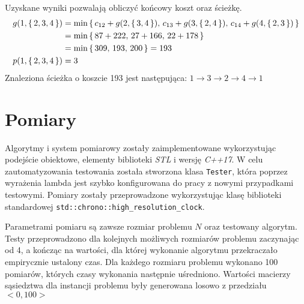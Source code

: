 \documentclass[12pt]{article}
\begin{document}
Uzyskane wyniki pozwalają obliczyć końcowy koszt oraz ścieżkę.
\begin{align}
    g(1, \set{2,3,4}) & = \min\set{c_{12}+g(2, \set{3,4}),\,c_{13}+g(3, \set{2,4}),\,c_{14}+g(4, \set{2,3})}\nonumber \\
                      & = \min{\set{87+222,\,27+166,\,22+178}}                                                        \\
                      & = \min{\set{309,\,193,\,200}} = 193 \nonumber                                                 \\
    p(1, \set{2,3,4}) & = 3
\end{align}
Znaleziona ścieżka o koszcie 193 jest następująca:
$ 1 \rightarrow 3 \rightarrow 2 \rightarrow 4 \rightarrow 1 $
\section{Pomiary}
Algorytmy i system pomiarowy zostały zaimplementowane wykorzystując podejście obiektowe, elementy biblioteki \textit{STL} i wersję \textit{C++17}.
W celu zautomatyzowania testowania została stworzona klasa \lstinline{Tester}, która poprzez wyrażenia lambda jest szybko konfigurowana do pracy z nowymi przypadkami testowymi. Pomiary zostały przeprowadzone wykorzystując klasę biblioteki standardowej \lstinline{std::chrono::high_resolution_clock}.

Parametrami pomiaru są zawsze rozmiar problemu $N$ oraz testowany algorytm. Testy przeprowadzono dla kolejnych możliwych rozmiarów problemu zaczynając od 4, a kończąc na wartości, dla której wykonanie algorytmu przekraczało empirycznie ustalony czas. Dla każdego rozmiaru problemu wykonano 100 pomiarów, których czasy wykonania następnie uśredniono. Wartości macierzy sąsiedztwa dla instancji problemu były generowana losowo z przedziału $<0,100>$


\newcommand{\oneplot}[3]{
    \begin{figure}[H]
        \centering
        \begin{tikzpicture}
            \begin{axis}[
                width=0.9\linewidth,
                height=7cm,
                grid=major,
                xlabel=N,
                ylabel=T{[s]},
                xticklabel={%
                        \pgfmathtruncatemacro{\IntegerTick}{\tick}%
                        \pgfmathprintnumberto[verbatim,fixed,precision=3]{\tick}\tickAdjusted%
                        \pgfmathparse{\IntegerTick == \tickAdjusted ? 1: 0}%
                        \ifnum\pgfmathresult>0\relax$\IntegerTick$\else\fi%
                    },
                legend style={anchor=north west, at={(0,1)}}
                ]
                \addplot table [x=startElements, y=time, col sep=comma] {./../../benchmark/#1.csv};
                \addlegendentry{#2}
            \end{axis}
        \end{tikzpicture}
        \caption{Średnie czasy wykonania algorytmu wykorzystującego metodę #3}
    \end{figure}
}
\end{document}
